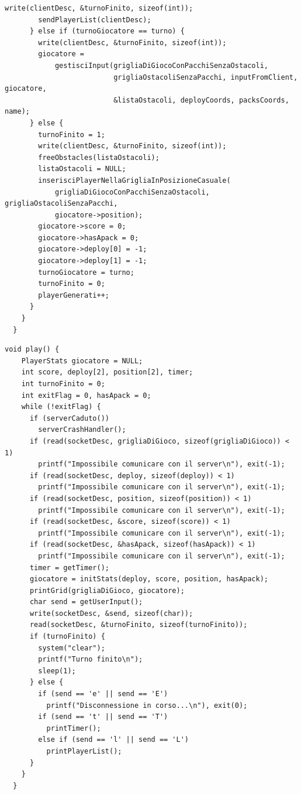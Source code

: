\documentclass[a4paper]{article}
\begin{document}
\begin{lstlisting}[caption=Funzione play del server, label=alg:playServer]
        write(clientDesc, &turnoFinito, sizeof(int));
        sendPlayerList(clientDesc);
      } else if (turnoGiocatore == turno) {
        write(clientDesc, &turnoFinito, sizeof(int));
        giocatore =
            gestisciInput(grigliaDiGiocoConPacchiSenzaOstacoli,
                          grigliaOstacoliSenzaPacchi, inputFromClient, giocatore,
                          &listaOstacoli, deployCoords, packsCoords, name);
      } else {
        turnoFinito = 1;
        write(clientDesc, &turnoFinito, sizeof(int));
        freeObstacles(listaOstacoli);
        listaOstacoli = NULL;
        inserisciPlayerNellaGrigliaInPosizioneCasuale(
            grigliaDiGiocoConPacchiSenzaOstacoli, grigliaOstacoliSenzaPacchi,
            giocatore->position);
        giocatore->score = 0;
        giocatore->hasApack = 0;
        giocatore->deploy[0] = -1;
        giocatore->deploy[1] = -1;
        turnoGiocatore = turno;
        turnoFinito = 0;
        playerGenerati++;
      }
    }
  }  
\end{lstlisting}
\pagebreak
\begin{lstlisting}[caption=Funzione play del client, label=alg:playclient]
  void play() {
    PlayerStats giocatore = NULL;
    int score, deploy[2], position[2], timer;
    int turnoFinito = 0;
    int exitFlag = 0, hasApack = 0;
    while (!exitFlag) {
      if (serverCaduto())
        serverCrashHandler();
      if (read(socketDesc, grigliaDiGioco, sizeof(grigliaDiGioco)) < 1)
        printf("Impossibile comunicare con il server\n"), exit(-1);
      if (read(socketDesc, deploy, sizeof(deploy)) < 1)
        printf("Impossibile comunicare con il server\n"), exit(-1);
      if (read(socketDesc, position, sizeof(position)) < 1)
        printf("Impossibile comunicare con il server\n"), exit(-1);
      if (read(socketDesc, &score, sizeof(score)) < 1)
        printf("Impossibile comunicare con il server\n"), exit(-1);
      if (read(socketDesc, &hasApack, sizeof(hasApack)) < 1)
        printf("Impossibile comunicare con il server\n"), exit(-1);
      timer = getTimer();
      giocatore = initStats(deploy, score, position, hasApack);
      printGrid(grigliaDiGioco, giocatore);
      char send = getUserInput();
      write(socketDesc, &send, sizeof(char));
      read(socketDesc, &turnoFinito, sizeof(turnoFinito));
      if (turnoFinito) {
        system("clear");
        printf("Turno finito\n");
        sleep(1);
      } else {
        if (send == 'e' || send == 'E')
          printf("Disconnessione in corso...\n"), exit(0);
        if (send == 't' || send == 'T')
          printTimer();
        else if (send == 'l' || send == 'L')
          printPlayerList();
      }
    }
  }    
\end{lstlisting}
\lstlistoflistings
\end{document}
